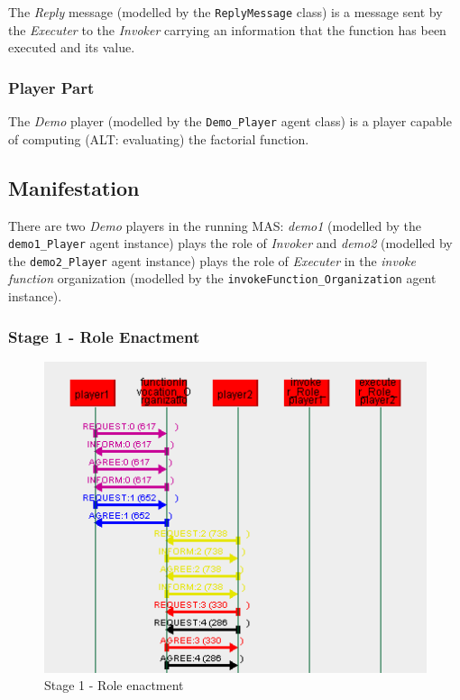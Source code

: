 The \textit{Reply} message (modelled by the \texttt{ReplyMessage} class) is a message sent by the \textit{Executer} to the \textit{Invoker} carrying an information that the function has been executed and its value.

\subsubsection*{Player Part}

The \textit{Demo} player (modelled by the \texttt{Demo\_Player} agent class) is a player capable of computing (ALT: evaluating) the factorial function.

\subsection*{Manifestation}

There are two \textit{Demo} players in the running MAS: \textit{demo1} (modelled by the \texttt{demo1\_Player} agent instance) plays the role of \textit{Invoker} and \textit{demo2} (modelled by the \texttt{demo2\_Player} agent instance) plays the role of \textit{Executer} in the \textit{invoke function} organization (modelled by the \texttt{invokeFunction\_Organization} agent instance).

\subsubsection*{Stage 1 - Role Enactment}

\begin{figure}[H]
	\centering
	\includegraphics[width=\textwidth]{images/example1-stage1.png}
	\caption{Stage 1 - Role enactment}
	\label{figure:example1-stage1}
\end{figure}


